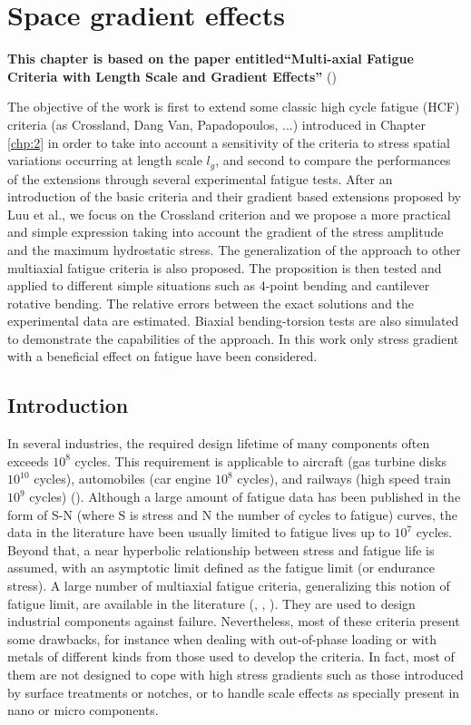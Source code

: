 \chapter{Space gradient effects}\label{chp:3}
\minitoc

\textbf{This chapter is based on the paper entitled``Multi-axial Fatigue Criteria with Length Scale and Gradient Effects'' }(\cite{zepeng2015multi})

The objective of the work is first to extend some classic high cycle fatigue (HCF) criteria (as Crossland, Dang Van, Papadopoulos, ...) introduced in Chapter \ref{chp:2} in order  to take into account a sensitivity of the criteria to stress spatial variations occurring at length scale $l_g$, and second to compare the performances of the extensions through several experimental fatigue tests. After an introduction of the basic criteria and their gradient based extensions proposed by Luu et al., we focus on the Crossland criterion and we  propose a more practical and simple expression taking into account the gradient of the stress amplitude and the maximum hydrostatic stress. The generalization of the approach to other multiaxial fatigue criteria is also proposed.  The proposition is then tested and applied to different simple situations such as 4-point bending and cantilever rotative bending.  The relative errors between the exact solutions and the experimental data are estimated. Biaxial  bending-torsion tests are also simulated to demonstrate the capabilities of the approach.  In this work only stress gradient with a beneficial effect on fatigue have been considered. 

\section{Introduction}

In several industries, the required design lifetime of many components often exceeds $ 10^8 $ cycles. This requirement is applicable to aircraft (gas turbine disks $ 10^{10} $ cycles), automobiles (car engine $ 10^8 $ cycles), and railways (high speed train $ 10^9 $ cycles) (\cite{wachtman2009mechanical}). Although a large amount of fatigue data has been published in the form of S-N (where S is stress and N  the number of cycles to fatigue) curves, the data in the literature have been usually limited to fatigue lives up to $ 10^7 $ cycles. Beyond that, a near hyperbolic relationship between stress and fatigue life is assumed, with an asymptotic limit defined as the fatigue limit (or endurance stress). 
A large number of multiaxial fatigue criteria, generalizing this notion of fatigue limit, are available in the literature (\cite{Papadopoulos1997219}, \cite{ballard1995high}, \cite{suresh1998fatigue}). They are  used to design industrial components against failure. Nevertheless, most of these criteria present some drawbacks,  for instance when dealing with out-of-phase loading or with metals of different kinds from those used to develop the criteria. In fact, most of them are not designed to cope with high stress gradients such as those introduced  by surface treatments or notches, or to handle  scale effects as  specially present in nano or micro components. 

